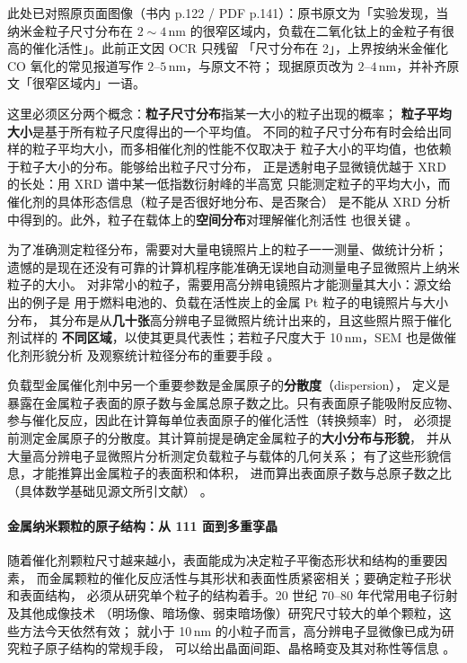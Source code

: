 此处已对照原页面图像（书内 p.122 / PDF p.141）：原书原文为「实验发现，当纳米金粒子尺寸分布在
$2\sim4$\,nm 的很窄区域内，负载在二氧化钛上的金粒子有很高的催化活性」。此前正文因 OCR 只残留
「尺寸分布在 2」，上界按纳米金催化 CO 氧化的常见报道写作 $2$--$5$\,nm，与原文不符；
现据原页改为 $2$--$4$\,nm，并补齐原文「很窄区域内」一语。

这里必须区分两个概念：\textbf{粒子尺寸分布}指某一大小的粒子出现的概率；
\textbf{粒子平均大小}是基于所有粒子尺度得出的一个平均值。
不同的粒子尺寸分布有时会给出同样的粒子平均大小，而多相催化剂的性能不仅取决于
粒子大小的平均值，也依赖于粒子大小的分布。能够给出粒子尺寸分布，
正是透射电子显微镜优越于 XRD 的长处：用 XRD 谱中某一低指数衍射峰的半高宽
只能测定粒子的平均大小，而催化剂的具体形态信息（粒子是否很好地分布、是否聚合）
是不能从 XRD 分析中得到的。此外，粒子在载体上的\textbf{空间分布}对理解催化剂活性
也很关键
。

为了准确测定粒径分布，需要对大量电镜照片上的粒子一一测量、做统计分析；
遗憾的是现在还没有可靠的计算机程序能准确无误地自动测量电子显微照片上纳米粒子的大小。
对非常小的粒子，需要用高分辨电镜照片才能测量其大小：源文给出的例子是
用于燃料电池的、负载在活性炭上的金属 Pt 粒子的电镜照片与大小分布，
其分布是从\textbf{几十张}高分辨电子显微照片统计出来的，且这些照片照于催化剂试样的
\textbf{不同区域}，以使其更具代表性；若粒子尺度大于 10\,nm，SEM 也是做催化剂形貌分析
及观察统计粒径分布的重要手段
。

负载型金属催化剂中另一个重要参数是金属原子的\textbf{分散度}（dispersion），
定义是暴露在金属粒子表面的原子数与金属总原子数之比。只有表面原子能吸附反应物、
参与催化反应，因此在计算每单位表面原子的催化活性（转换频率）时，
必须提前测定金属原子的分散度。其计算前提是确定金属粒子的\textbf{大小分布与形貌}，
并从大量高分辨电子显微照片分析测定负载粒子与载体的几何关系；
有了这些形貌信息，才能推算出金属粒子的表面积和体积，
进而算出表面原子数与总原子数之比（具体数学基础见源文所引文献）
。

\paragraph{金属纳米颗粒的原子结构：从 {111} 面到多重孪晶}
随着催化剂颗粒尺寸越来越小，表面能成为决定粒子平衡态形状和结构的重要因素，
而金属颗粒的催化反应活性与其形状和表面性质紧密相关；要确定粒子形状和表面结构，
必须从研究单个粒子的结构着手。20 世纪 70--80 年代常用电子衍射及其他成像技术
（明场像、暗场像、弱束暗场像）研究尺寸较大的单个颗粒，这些方法今天依然有效；
就小于 10\,nm 的小粒子而言，高分辨电子显微像已成为研究粒子原子结构的常规手段，
可以给出晶面间距、晶格畸变及其对称性等信息
。

